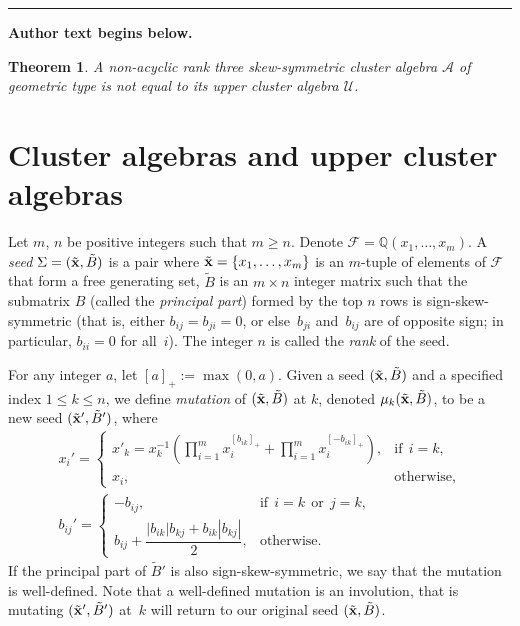 \documentclass[11pt]{article}
\numberwithin{equation}{section}
\newtheorem{Theorem}{Theorem}[section]
\begin{document}
\medskip\hrule\medskip\noindent\textbf{Author text begins below.}\par
\setcounter{section}{1}
\setcounter{subsection}{0}
\setcounter{subsubsection}{0}
\setcounter{Theorem}{2}
\setcounter{equation}{0}
\begin{Theorem}\label{main-cor}
A non-acyclic rank three skew-symmetric cluster algebra $\mathcal{A}$ of geometric type is not equal to its upper cluster algebra $\mathcal{U}$.
\end{Theorem}
\setcounter{section}{1}
\setcounter{subsection}{0}
\setcounter{subsubsection}{0}
\setcounter{Theorem}{3}
\setcounter{equation}{0}
\section{Cluster algebras and upper cluster algebras}\label{section2}

Let $m$, $n$ be positive integers such that $m\geq n$. Denote $\mathcal{F}=\mathbb{Q}(x_1,\dots,x_m)$.
A \emph{seed}  $\Sigma=(\tilde{\bf x},\tilde{B})$ is a pair where $\tilde{\bf x}=\{x_1,\ldots,x_m\}$ is an $m$-tuple of elements of $\mathcal{F}$ that form a free generating set, $\tilde{B}$ is an $m\times n$ integer matrix such that the submatrix $B$  (called the \emph{principal part}) formed by the top $n$ rows is sign-skew-symmetric (that is, either $b_{ij}=b_{ji}=0$, or else~$b_{ji}$ and~$b_{ij} $ are of opposite sign; in particular, $b_{ii}=0$ for all~$i$).
The integer $n$ is called the \emph{rank} of the seed.

For any integer $a$, let $[a]_+:= \max(0,a)$.
 Given a seed $(\tilde{\bf x},\tilde{B})$ and a specif\/ied index $1\leq k \leq n$, we def\/ine \emph{mutation} of $(\tilde{\bf x},\tilde{B})$ at $k$, denoted $\mu_{k}(\tilde{\bf x},\tilde{B})$, to be a new seed $(\tilde{\bf x}',\tilde{B}')$, where
\begin{gather*}
 x_i' = \begin{cases}
\displaystyle  x'_k=x_k^{-1}\left(\prod\limits_{i=1}^{m}x_i^{[b_{ik}]_+}+\prod\limits_{i=1}^{m}x_i^{[-b_{ik}]_+}\right),
  & \mbox{if} \ \  i=k, \\
x_i, & \mbox{otherwise}, \end{cases}\\
b_{ij}' = \begin{cases} -b_{ij}, & \mbox{if} \ \ i=k \ \ \text{or} \ \ j=k,  \\
b_{ij} + \dfrac{|b_{ik}|b_{kj} + b_{ik}|b_{kj}|}{2}, & \mbox{otherwise.}
\end{cases}
\end{gather*}
If the principal part of $\tilde{B}'$ is also sign-skew-symmetric, we say that the mutation is well-def\/ined.
Note that a well-def\/ined mutation is an involution, that is mutating $(\tilde{\bf x}', \tilde{B}')$ at~$k$ will return to our original seed $(\tilde{\bf x}, \tilde{B})$.
\end{document}
